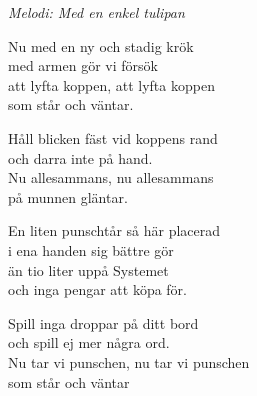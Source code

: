 {\footnotesize\textit{Melodi: Med en enkel tulipan}}\par
\vspace{10pt}
Nu med en ny och stadig krök\\
med armen gör vi försök\\
att lyfta koppen, att lyfta koppen\\
som står och väntar.\par
\vspace{10pt}
Håll blicken fäst vid koppens rand \\
och darra inte på hand.\\
Nu allesammans, nu allesammans\\
på munnen gläntar.\par
\vspace{10pt}
En liten punschtår så här placerad\\
i ena handen sig bättre gör\\
än tio liter uppå Systemet\\
och inga pengar att köpa för.\par
\vspace{10pt}
Spill inga droppar på ditt bord\\
och spill ej mer några ord.\\
Nu tar vi punschen, nu tar vi punschen\\
som står och väntar
